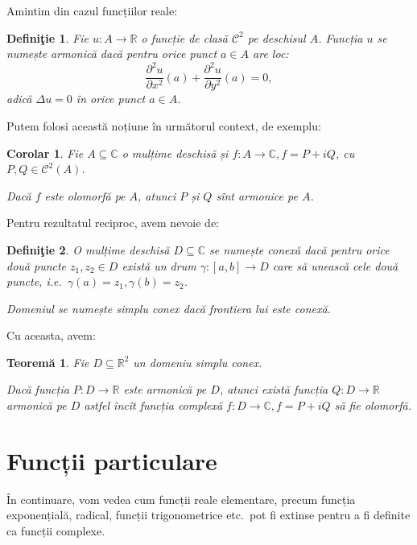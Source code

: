 \documentclass[11pt,a4paper]{article}
\newcommand\kal{\mathcal}
\newcommand\seq{\subseteq}
\newcommand\RR{\mathbb{R}}
\newcommand\CC{\mathbb{C}}
\theoremstyle{dotless}
\newtheorem{theorem}{Teorem\u{a}}
\newtheorem{corollary}{Corolar}
\theoremstyle{dotlessdr}
\newtheorem{definition}{Defini\c{t}ie}
\begin{document}
Amintim din cazul funcțiilor reale:
\begin{definition}\label{def:fc-armonica}
  Fie $ u : A \to \RR $ o funcție de clasă $ \kal{C}^2 $ pe deschisul $ A $.
  Funcția $ u $ se numește \emph{armonică} dacă pentru orice punct $ a \in A $
  are loc:
  \[
    \frac{\partial^2 u}{\partial x^2}(a) + \frac{\partial^2 u}{\partial y^2}(a) = 0,
  \]
  adică $ \Delta u = 0 $ în orice punct $ a \in A $.
\end{definition}

Putem folosi această noțiune în următorul context, de exemplu:

\begin{corollary}\label{cor:olo-arm}
  Fie $ A \seq \CC $ o mulțime deschisă și $ f : A \to \CC, f = P + iQ $, cu
  $ P, Q \in \kal{C}^2(A) $.

  Dacă $ f $ este olomorfă pe $ A $, atunci $ P $ și $ Q $ sînt armonice pe $ A $.
\end{corollary}

Pentru rezultatul reciproc, avem nevoie de:

\begin{definition}\label{def:conex}
  O mulțime deschisă $ D \seq \CC $ se numește \emph{conexă} dacă pentru orice
  două puncte $ z_1, z_2 \in D $ există un drum $ \gamma: [a, b] \to D $
  care să unească cele două puncte, i.e.\ $ \gamma(a) = z_1, \gamma(b) = z_2 $.

  Domeniul se numește \emph{simplu conex} dacă frontiera lui este conexă.
\end{definition}

Cu aceasta, avem:

\begin{theorem}\label{thm:sconex-arm-olo}
  Fie $ D \seq \RR^2 $ un domeniu simplu conex.

  Dacă funcția $ P : D \to \RR $ este armonică pe $ D $, atunci există funcția
  $ Q : D \to \RR $ armonică pe $ D $ astfel încît funcția complexă
  $ f : D \to \CC, f = P + iQ $ să fie olomorfă.
\end{theorem}


\section*{Funcții particulare}

\indent\indent În continuare, vom vedea cum funcții reale elementare, precum
funcția exponențială, radical, funcții trigonometrice etc.\ pot fi extinse pentru
a fi definite ca funcții complexe.
\end{document}
